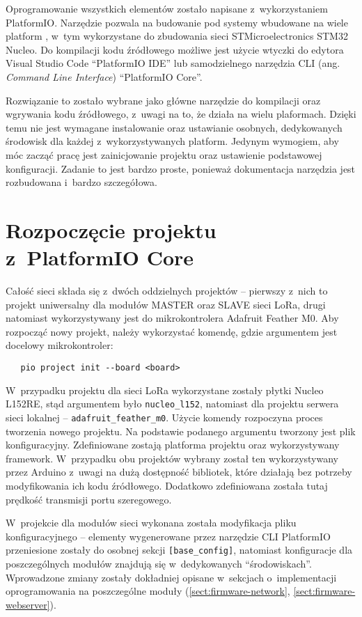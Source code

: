 Oprogramowanie wszystkich elementów zostało napisane z~wykorzystaniem PlatformIO. Narzędzie pozwala na budowanie pod
systemy wbudowane na wiele platform \cite{pio-platforms}, w~tym wykorzystane do zbudowania sieci STMicroelectronics
STM32 Nucleo. Do kompilacji kodu źródłowego możliwe jest użycie wtyczki do edytora Visual Studio Code
\enquote{PlatformIO IDE} lub samodzielnego narzędzia CLI (ang. \textsl{Command Line Interface}) \enquote{PlatformIO
    Core}.

Rozwiązanie to zostało wybrane jako główne narzędzie do kompilacji oraz wgrywania kodu źródłowego, z~uwagi na to, że
działa na wielu plaformach. Dzięki temu nie jest wymagane instalowanie oraz ustawianie osobnych, dedykowanych środowisk
dla każdej z~wykorzystywanych platform. Jedynym wymogiem, aby móc zacząć pracę jest zainicjowanie projektu oraz
ustawienie podstawowej konfiguracji. Zadanie to jest bardzo proste, ponieważ dokumentacja narzędzia jest rozbudowana
i~bardzo szczegółowa.

\section{Rozpoczęcie projektu z~PlatformIO Core\label{sect:pio-intro}} Całość sieci składa się z~dwóch oddzielnych
projektów -- pierwszy z~nich to projekt uniwersalny dla modułów MASTER oraz SLAVE sieci LoRa, drugi natomiast
wykorzystywany jest do mikrokontrolera Adafruit Feather M0. Aby rozpocząć nowy projekt, należy wykorzystać komendę,
gdzie argumentem jest docelowy mikrokontroler:
\begin{verbatim}
   pio project init --board <board>
\end{verbatim}

W~przypadku projektu dla sieci LoRa wykorzystane zostały płytki Nucleo L152RE, stąd argumentem było
\texttt{nucleo\_l152}, natomiast dla projektu serwera sieci lokalnej -- \texttt{adafruit\_feather\_m0}. Użycie komendy
rozpoczyna proces tworzenia nowego projektu. Na podstawie podanego argumentu tworzony jest plik konfiguracyjny.
Zdefiniowane zostają platforma projektu oraz wykorzystywany framework. W~przypadku obu projektów wybrany został ten
wykorzystywany przez Arduino z~uwagi na dużą dostępność bibliotek, które działają bez potrzeby modyfikowania ich kodu
źródłowego. Dodatkowo zdefiniowana została tutaj prędkość transmisji portu szeregowego.

W~projekcie dla modułów sieci wykonana została modyfikacja pliku konfiguracyjnego -- elementy wygenerowane przez
narzędzie CLI PlatformIO przeniesione zostały do osobnej sekcji \texttt{[base\_config]}, natomiast konfiguracje dla
poszczególnych modułów znajdują się w~dedykowanych \enquote{środowiskach}. Wprowadzone zmiany zostały dokładniej opisane
w~sekcjach o~implementacji oprogramowania na poszczególne moduły (\ref{sect:firmware-network},
\ref{sect:firmware-webserver}).

